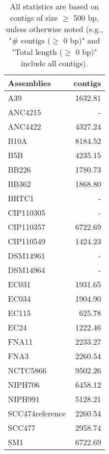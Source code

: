 \documentclass[12pt,a4paper]{article}
\begin{document}
\begin{table}[ht]
\begin{center}
\caption{All statistics are based on contigs of size $\geq$ 500 bp, unless otherwise noted (e.g., "\# contigs ($\geq$ 0 bp)" and "Total length ($\geq$ 0 bp)" include all contigs).}
\begin{tabular}{|l*{1}{|r}|}
\hline
Assemblies & contigs \\ \hline
A39 & 1632.81 \\ \hline
ANC4215 & - \\ \hline
ANC4422 & 4327.24 \\ \hline
B10A & 8184.52 \\ \hline
B5B & 4235.15 \\ \hline
BB226 & 1780.73 \\ \hline
BB362 & 1868.80 \\ \hline
BRTC1 & - \\ \hline
CIP110305 & - \\ \hline
CIP110357 & 6722.69 \\ \hline
CIP110549 & 1424.23 \\ \hline
DSM14961 & - \\ \hline
DSM14964 & - \\ \hline
EC031 & 1931.65 \\ \hline
EC034 & 1904.90 \\ \hline
EC115 & 625.78 \\ \hline
EC24 & 1222.46 \\ \hline
FNA11 & 2233.27 \\ \hline
FNA3 & 2260.54 \\ \hline
NCTC5866 & 9502.26 \\ \hline
NIPH706 & 6458.12 \\ \hline
NIPH991 & 5128.21 \\ \hline
SCC474reference & 2260.54 \\ \hline
SCC477 & 2958.74 \\ \hline
SM1 & 6722.69 \\ \hline
\end{tabular}
\end{center}
\end{table}
\end{document}
